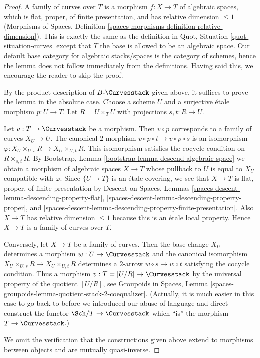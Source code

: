 \begin{proof}
A family of curves over $T$ is a morphism $f : X \to T$ of algebraic
spaces, which is flat, proper, of finite presentation, and has
relative dimension $\leq 1$ (Morphisms of Spaces, Definition
\ref{spaces-morphisms-definition-relative-dimension}).
This is exactly the same as the definition in
Quot, Situation \ref{quot-situation-curves}
except that $T$ the base is allowed to be an algebraic space.
Our default base category for algebraic stacks/spaces
is the category of schemes, hence the lemma does not follow
immediately from the definitions. Having said this, we encourage
the reader to skip the proof.

\medskip\noindent
By the product description of $B\text{-}\Curvesstack$ given above,
it suffices to prove the lemma in the absolute case. Choose a scheme
$U$ and a surjective \'etale morphism $p : U \to T$.
Let $R = U \times_T U$ with projections $s, t : R \to U$.

\medskip\noindent
Let $v : T \to \Curvesstack$ be a morphism. Then $v \circ p$
corresponds to a family of curves $X_U \to U$. The canonical
$2$-morphism $v \circ p \circ t \to v \circ p \circ s$
is an isomorphism $\varphi : X_U \times_{U, s} R \to X_U \times_{U, t} R$.
This isomorphism satisfies the cocycle condition on
$R \times_{s, t} R$.
By Bootstrap, Lemma \ref{bootstrap-lemma-descend-algebraic-space}
we obtain a morphism of algebraic spaces $X \to T$
whose pullback to $U$ is equal to $X_U$ compatible with $\varphi$.
Since $\{U \to T\}$ is an \'etale covering, we see that
$X \to T$ is flat, proper, of finite presentation by
Descent on Spaces, Lemmas
\ref{spaces-descent-lemma-descending-property-flat},
\ref{spaces-descent-lemma-descending-property-proper}, and
\ref{spaces-descent-lemma-descending-property-finite-presentation}.
Also $X \to T$ has relative dimension $\leq 1$ because this is
an \'etale local property. Hence $X \to T$ is a family of curves over $T$.

\medskip\noindent
Conversely, let $X \to T$ be a family of curves. Then the
base change $X_U$ determines a morphism $w : U \to \Curvesstack$
and the canonical isomorphism $X_U \times_{U, s} R \to X_U \times_{U, t} R$
determines a $2$-arrow $w \circ s \to w \circ t$ satisfying the
cocycle condition. Thus a morphism $v : T = [U/R] \to \Curvesstack$
by the universal property of the quotient $[U/R]$, see
Groupoids in Spaces, Lemma
\ref{spaces-groupoids-lemma-quotient-stack-2-coequalizer}.
(Actually, it is much easier in this case to go back to before
we introduced our abuse of language and direct construct
the functor $\Sch/T \to \Curvesstack$ which ``is'' the
morphism $T \to \Curvesstack$.)

\medskip\noindent
We omit the verification that the constructions given above
extend to morphisms between objects and are mutually quasi-inverse.
\end{proof}






